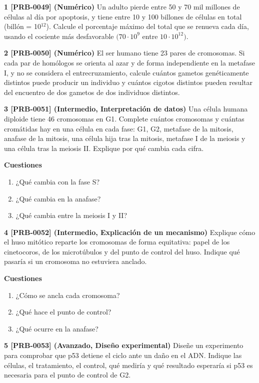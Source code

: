 \documentclass{book}
\begin{document}
\begin{tcolorbox}[title={Ejercicios}, studiumworked, breakable]

\noindent\textbf{1 [PRB-0049] (Numérico)}
Un adulto pierde entre 50 y 70 mil millones de células al día por apoptosis, y tiene entre 10 y 100 billones de células en total (billón = 10\({}^{12}\)). Calcule el porcentaje máximo del total que se renueva cada día, usando el cociente más desfavorable \((70\cdot10^{9}\) entre \(10\cdot10^{12})\).


\noindent\textbf{2 [PRB-0050] (Numérico)}
El ser humano tiene 23 pares de cromosomas. Si cada par de homólogos se orienta al azar y de forma independiente en la metafase I, y no se considera el entrecruzamiento, calcule cuántos gametos genéticamente distintos puede producir un individuo y cuántos cigotos distintos pueden resultar del encuentro de dos gametos de dos individuos distintos.


\noindent\textbf{3 [PRB-0051] (Intermedio, Interpretación de datos)}
Una célula humana diploide tiene 46 cromosomas en G1. Complete cuántos cromosomas y cuántas cromátidas hay en una célula en cada fase: G1, G2, metafase de la mitosis, anafase de la mitosis, una célula hija tras la mitosis, metafase I de la meiosis y una célula tras la meiosis II. Explique por qué cambia cada cifra.


\noindent\textbf{Cuestiones}
\begin{enumerate}
\item ¿Qué cambia con la fase S?
\item ¿Qué cambia en la anafase?
\item ¿Qué cambia entre la meiosis I y II?
\end{enumerate}

\noindent\textbf{4 [PRB-0052] (Intermedio, Explicación de un mecanismo)}
Explique cómo el huso mitótico reparte los cromosomas de forma equitativa: papel de los cinetocoros, de los microtúbulos y del punto de control del huso. Indique qué pasaría si un cromosoma no estuviera anclado.


\noindent\textbf{Cuestiones}
\begin{enumerate}
\item ¿Cómo se ancla cada cromosoma?
\item ¿Qué hace el punto de control?
\item ¿Qué ocurre en la anafase?
\end{enumerate}

\noindent\textbf{5 [PRB-0053] (Avanzado, Diseño experimental)}
Diseñe un experimento para comprobar que p53 detiene el ciclo ante un daño en el ADN. Indique las células, el tratamiento, el control, qué mediría y qué resultado esperaría si p53 es necesaria para el punto de control de G2.



\end{tcolorbox}
\end{document}
